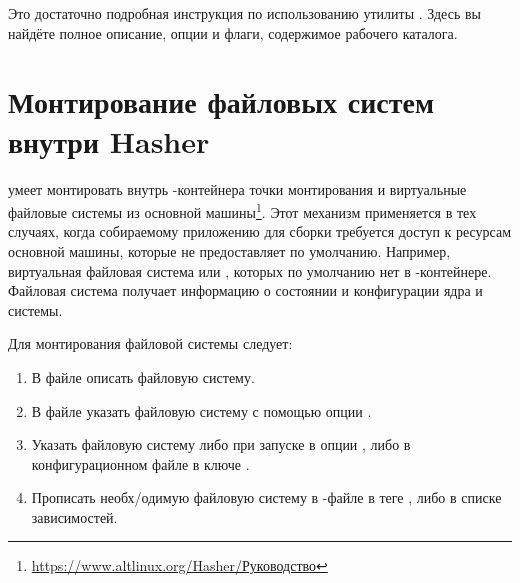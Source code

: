 Это достаточно подробная инструкция по использованию утилиты . Здесь вы найдёте полное описание, опции и флаги, содержимое рабочего каталога. 


\section{Монтирование файловых систем внутри Hasher}
 умеет монтировать внутрь -контейнера точки монтирования и виртуальные файловые системы из основной машины\footnote{\href{https://www.altlinux.org/Hasher/\%D0\%A0\%D1\%83\%D0\%BA\%D0\%BE\%D0\%B2\%D0\%BE\%D0\%B4\%D1\%81\%D1\%82\%D0\%B2\%D0\%BE\#\%D0\%9C\%D0\%BE\%D0\%BD\%D1\%82\%D0\%B8\%D1\%80\%D0\%BE\%D0\%B2\%D0\%B0\%D0\%BD\%D0\%B8\%D0\%B5_\%D1\%84\%D0\%B0\%D0\%B9\%D0\%BB\%D0\%BE\%D0\%B2\%D1\%8B\%D1\%85_\%D1\%81\%D0\%B8\%D1\%81\%D1\%82\%D0\%B5\%D0\%BC_\%D0\%B2\%D0\%BD\%D1\%83\%D1\%82\%D1\%80\%D0\%B8_hasher}{https://www.altlinux.org/Hasher/Руководство}}. Этот механизм применяется в тех случаях, когда собираемому приложению для сборки требуется доступ к ресурсам основной машины, которые  не предоставляет по умолчанию. Например, виртуальная файловая система  или , которых по умолчанию нет в -контейнере. Файловая система  получает информацию о состоянии и конфигурации ядра и системы.

Для монтирования файловой системы следует:
\begin{enumerate}
	\item В файле  описать файловую систему.
	\item В файле  указать файловую систему с помощью опции .
	\item Указать файловую систему либо при запуске  в опции , либо в конфигурационном файле  в ключе .
	\item Прописать необх/одимую файловую систему в -файле в теге , либо в списке зависимостей.
\end{enumerate} 